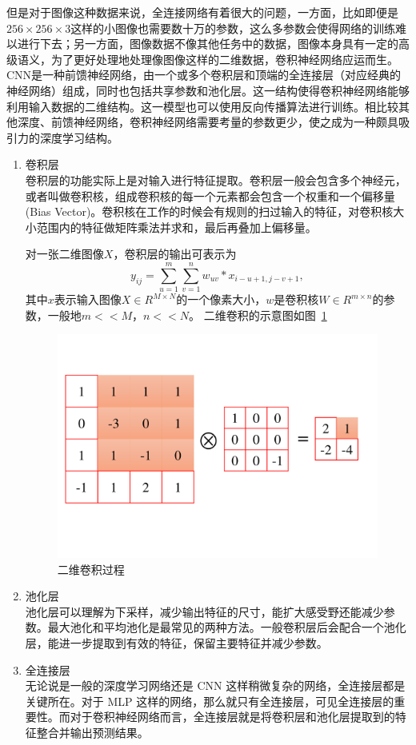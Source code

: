 但是对于图像这种数据来说，全连接网络有着很大的问题，一方面，比如即便是$256 \times 256 \times 3$这样的小图像也需要数十万的参数，这么多参数会使得网络的训练难以进行下去；另一方面，图像数据不像其他任务中的数据，图像本身具有一定的高级语义，为了更好处理地处理像图像这样的二维数据，卷积神经网络应运而生。CNN是一种前馈神经网络，由一个或多个卷积层和顶端的全连接层（对应经典的神经网络）组成，同时也包括共享参数和池化层。这一结构使得卷积神经网络能够利用输入数据的二维结构。这一模型也可以使用反向传播算法\cite{rumelhart1986learning}进行训练。相比较其他深度、前馈神经网络，卷积神经网络需要考量的参数更少，使之成为一种颇具吸引力的深度学习结构。

\begin{enumerate}
    \item 卷积层　\\
    卷积层的功能实际上是对输入进行特征提取。卷积层一般会包含多个神经元，或者叫做卷积核，组成卷积核的每一个元素都会包含一个权重和一个偏移量 (Bias Vector)。卷积核在工作的时候会有规则的扫过输入的特征，对卷积核大小范围内的特征做矩阵乘法并求和，最后再叠加上偏移量。
    
    对一张二维图像$X$，卷积层的输出可表示为
    \begin{equation}
        y_{ij} = \sum_{u=1}^{m}\sum_{v=1}^{n}w_{uv} * x_{i-u+1,j-v+1},
    \end{equation}
    其中$x$表示输入图像$X\in{R^{M\times N}}$的一个像素大小，$w$是卷积核$W \in R^{m\times n}$的参数，一般地$m << M$，$n << N$。
    二维卷积的示意图如图~\ref{fig:2dconv}
    \begin{figure}[htbp]
        \centering
        \includegraphics[width=0.7\linewidth]{figures/2dconv.pdf}
        \caption{二维卷积过程}
        \label{fig:2dconv}
    \end{figure}
    \item 池化层　\\
    池化层可以理解为下采样，减少输出特征的尺寸，能扩大感受野还能减少参数。最大池化和平均池化是最常见的两种方法。一般卷积层后会配合一个池化层，能进一步提取到有效的特征，保留主要特征并减少参数。
    \item 全连接层　\\
    无论说是一般的深度学习网络还是 CNN 这样稍微复杂的网络，全连接层都是关键所在。对于 MLP 这样的网络，那么就只有全连接层，可见全连接层的重要性。而对于卷积神经网络而言，全连接层就是将卷积层和池化层提取到的特征整合并输出预测结果。
\end{enumerate}

